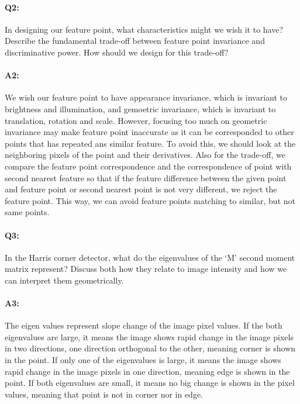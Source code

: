 
\pagebreak
\paragraph{Q2:} In designing our feature point, what characteristics might we wish it to have? Describe the fundamental trade-off between feature point invariance and discriminative power. How should we design for this trade-off?

\paragraph{A2:} We wish our feature point to have appearance invariance, which is invariant to brightness and illumination, and gemoetric invariance, which is invariant to translation, rotation and scale. However, focusing too much on geometric invariance may make feature point inaccurate as it can be corresponded to other points that has repeated ans similar feature. To avoid this, we should look at the neighboring pixels of the point and their derivatives. Also for the trade-off, we compare the feature point correspondence and the correspondence of point with second nearest feature so that if the feature difference between the given point and feature point or second nearest point is not very different, we reject the feature point. This way, we can avoid feature points matching to similar, but not same points. 




\pagebreak
\paragraph{Q3:} In the Harris corner detector, what do the eigenvalues of the `M' second moment matrix represent? Discuss both how they relate to image intensity and how we can interpret them geometrically.

\paragraph{A3:} The eigen values represent slope change of the image pixel values. If the both eigenvalues are large, it means the image shows rapid change in the image pixels in two directions, one direction orthogonal to the other, meaning corner is shown in the point. If only one of the eigenvalues is large, it means the image shows rapid change in the image pixels in one direction, meaning edge is shown in the point. If both eigenvalues are small, it means no big change is shown in the pixel values, meaning that point is not in corner nor in edge. 



